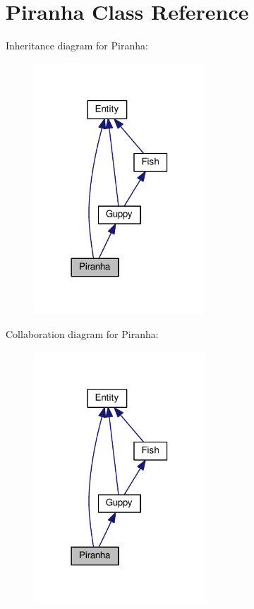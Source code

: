 \hypertarget{classPiranha}{}\section{Piranha Class Reference}
\label{classPiranha}


Inheritance diagram for Piranha\+:
\nopagebreak
\begin{figure}[H]
\begin{center}
\leavevmode
\includegraphics[width=182pt]{classPiranha__inherit__graph}
\end{center}
\end{figure}


Collaboration diagram for Piranha\+:
\nopagebreak
\begin{figure}[H]
\begin{center}
\leavevmode
\includegraphics[width=182pt]{classPiranha__coll__graph}
\end{center}
\end{figure}
